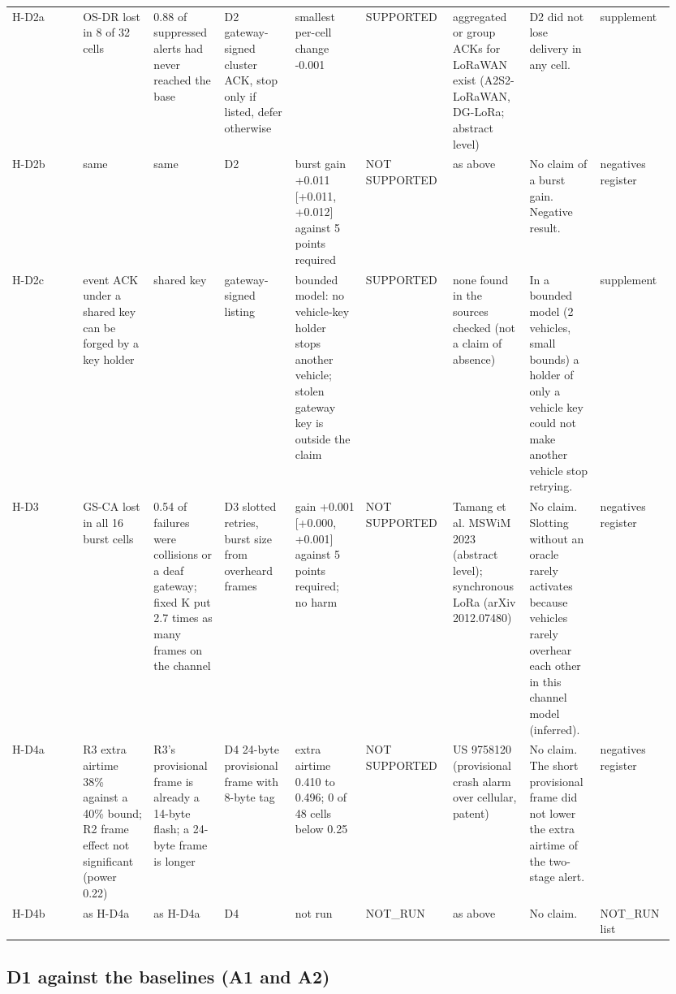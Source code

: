 {\begin{longtable}{p{0.106\linewidth}p{0.106\linewidth}p{0.106\linewidth}p{0.106\linewidth}p{0.106\linewidth}p{0.106\linewidth}p{0.106\linewidth}p{0.106\linewidth}p{0.106\linewidth}}
H-D2a & OS-DR lost in 8 of 32 cells & 0.88 of suppressed alerts had never reached the base & D2 gateway-signed cluster ACK, stop only if listed, defer otherwise & smallest per-cell change -0.001 & SUPPORTED & aggregated or group ACKs for LoRaWAN exist (A2S2-LoRaWAN, DG-LoRa; abstract level) & D2 did not lose delivery in any cell. & supplement \\
H-D2b & same & same & D2 & burst gain +0.011 [+0.011, +0.012] against 5 points required & NOT SUPPORTED & as above & No claim of a burst gain. Negative result. & negatives register \\
H-D2c & event ACK under a shared key can be forged by a key holder & shared key & gateway-signed listing & bounded model: no vehicle-key holder stops another vehicle; stolen gateway key is outside the claim & SUPPORTED & none found in the sources checked (not a claim of absence) & In a bounded model (2 vehicles, small bounds) a holder of only a vehicle key could not make another vehicle stop retrying. & supplement \\
H-D3 & GS-CA lost in all 16 burst cells & 0.54 of failures were collisions or a deaf gateway; fixed K put 2.7 times as many frames on the channel & D3 slotted retries, burst size from overheard frames & gain +0.001 [+0.000, +0.001] against 5 points required; no harm & NOT SUPPORTED & Tamang et al. MSWiM 2023 (abstract level); synchronous LoRa (arXiv 2012.07480) & No claim. Slotting without an oracle rarely activates because vehicles rarely overhear each other in this channel model (inferred). & negatives register \\
H-D4a & R3 extra airtime 38\% against a 40\% bound; R2 frame effect not significant (power 0.22) & R3's provisional frame is already a 14-byte flash; a 24-byte frame is longer & D4 24-byte provisional frame with 8-byte tag & extra airtime 0.410 to 0.496; 0 of 48 cells below 0.25 & NOT SUPPORTED & US 9758120 (provisional crash alarm over cellular, patent) & No claim. The short provisional frame did not lower the extra airtime of the two-stage alert. & negatives register \\
H-D4b & as H-D4a & as H-D4a & D4 & not run & NOT\_RUN & as above & No claim. & NOT\_RUN list \\
\bottomrule
\end{longtable}}

\subsection*{D1 against the baselines (A1 and A2)}

